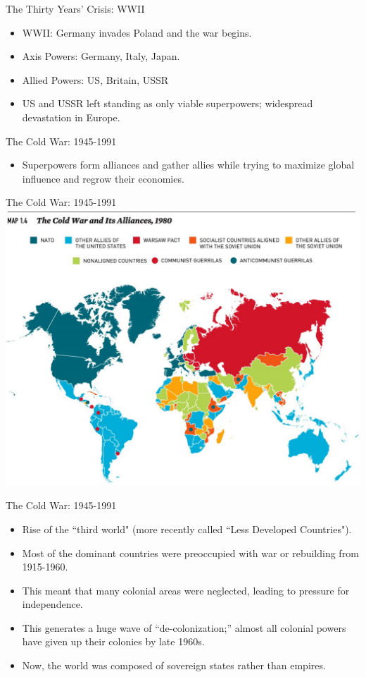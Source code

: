 \documentclass[handout]{beamer}
\begin{document}
\begin{frame}{\LARGE The Thirty Years' Crisis: WWII}
	\begin{itemize}
		\item WWII: Germany invades Poland and the war begins.
		\item Axis Powers: Germany, Italy, Japan.
		\item Allied Powers: US, Britain, USSR
		\item US and USSR left standing as only viable superpowers; widespread devastation in Europe.
	\end{itemize}
\end{frame}

\begin{frame}{\LARGE The Cold War: 1945-1991}
	\begin{itemize}
		\item Superpowers form alliances and gather allies while trying to maximize global influence and regrow their economies.
	\end{itemize}
\end{frame}

\begin{frame}{\LARGE The Cold War: 1945-1991}
	\centering
	\includegraphics[width=\textwidth,height=.9\textheight,keepaspectratio]{ColdWar1980.jpg}
\end{frame}

\begin{frame}{\LARGE The Cold War: 1945-1991}
	\begin{itemize}
		\item Rise of the ``third world" (more recently called ``Less Developed Countries").
		\item Most of the dominant countries were preoccupied with war or rebuilding from 1915-1960.
		\item This meant that many colonial areas were neglected, leading to pressure for independence.
		\item This generates a huge wave of “de-colonization;” almost all colonial powers have given up their colonies by late 1960s.
		\item Now, the world was composed of sovereign states rather than empires.
	\end{itemize}
\end{frame}
\end{document}
